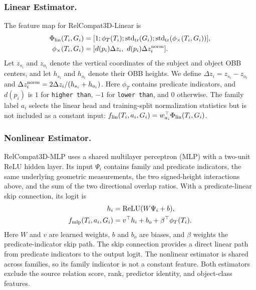 \subsubsection{Linear Estimator.}
The feature map for RelCompat3D-Linear is
\begin{equation}
\begin{aligned}
\Phi_{\rm lin}(T_i,G_i)&=[1;\phi_T(T_i);\operatorname{std}_{\rm tr}(G_i);
\operatorname{std}_{\rm tr}(\phi_{\times}(T_i,G_i))],\\
\phi_{\times}(T_i,G_i)&=
[d(p_i)\Delta z_i,\ d(p_i)\Delta z_i^{\rm norm}].
\end{aligned}
\end{equation}
Let $z_{s_i}$ and $z_{o_i}$ denote the vertical coordinates of the subject and object OBB centers, and let $h_{s_i}$ and $h_{o_i}$ denote their OBB heights. We define $\Delta z_i=z_{s_i}-z_{o_i}$ and $\Delta z_i^{\rm norm}=2\Delta z_i / (h_{s_i}+h_{o_i})$.
Here $\phi_T$ contains predicate indicators, and $d(p_i)$ is $1$ for \texttt{higher than}, $-1$ for \texttt{lower than}, and $0$ otherwise. The family label $a_i$ selects the linear head and training-split normalization statistics but is not included as a constant input: $f_{\rm lin}(T_i,a_i,G_i)=w_{a_i}^\top\Phi_{\rm lin}(T_i,G_i)$.

\subsubsection{Nonlinear Estimator.}
RelCompat3D-MLP uses a shared multilayer perceptron (MLP) with a two-unit ReLU hidden layer. Its input $\Psi_i$ contains family and predicate indicators, the same underlying geometric measurements, the two signed-height interactions above, and the sum of the two directional overlap ratios. With a predicate-linear skip connection, its logit is
\begin{equation}
\begin{aligned}
h_i&=\operatorname{ReLU}(W\Psi_i+b),\\
f_{\rm mlp}(T_i,a_i,G_i)&=v^\top h_i+b_o+
\beta^\top\phi_T(T_i).
\end{aligned}
\end{equation}
Here \(W\) and \(v\) are learned weights, \(b\) and \(b_o\) are biases,
and \(\beta\) weights the predicate-indicator skip path. The skip connection provides a direct linear path from predicate indicators to the output logit. The nonlinear estimator is shared across families, so its family indicator is not a constant feature. Both estimators exclude the source relation score, rank, predictor identity, and object-class features.

